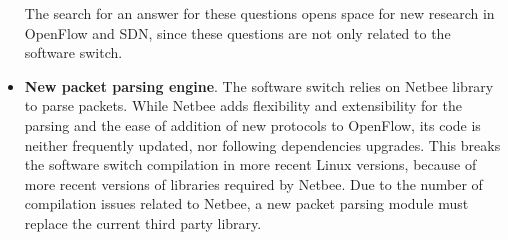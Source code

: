 \begin{itemize}
The search for an answer for these questions opens space for new research in OpenFlow and SDN, since these questions are not only related to the software switch. 
  
\item \textbf{New packet parsing engine}. The software switch relies on Netbee library to parse packets. While Netbee adds flexibility and extensibility for the parsing and the ease of addition of new protocols to OpenFlow, its code is neither frequently updated, nor following dependencies upgrades. This breaks the software switch compilation in more recent Linux versions, because of more recent versions of libraries required by Netbee. Due to the number of compilation issues related to Netbee, a new packet parsing module must replace the current third party library.

\end{itemize}

